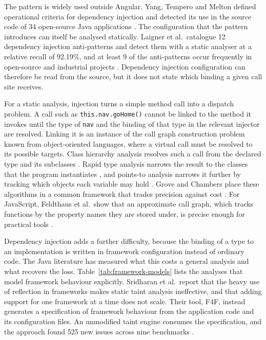 The pattern is widely used outside Angular. Yang, Tempero and Melton defined operational
criteria for dependency injection and detected its use in the source code of 34 open-source Java
applications \cite{yang2008empirical}. The configuration that the pattern introduces can itself be
analysed statically. Laigner et al.\ catalogue 12 dependency injection anti-patterns and detect
them with a static analyser at a relative recall of 92.19\%, and at least 9 of the anti-patterns
occur frequently in open-source and industrial projects \cite{laigner2022cataloging}. Dependency injection
configuration can therefore be read from the source, but it does not state which binding a given
call site receives.

For a static analysis, injection turns a simple method call into a dispatch problem. A call such
as \texttt{this.nav.goHome()} cannot be linked to the method it invokes until the type of
\texttt{nav} and the binding of that type in the relevant injector are resolved. Linking it is an
instance of the call graph construction problem known from object-oriented languages, where a
virtual call must be resolved to its possible targets. Class hierarchy analysis resolves such a
call from the declared type and its subclasses \cite{dean1995cha}. Rapid type analysis narrows
the result to the classes that the program instantiates \cite{bacon1996rta}, and points-to
analysis narrows it further by tracking which objects each variable may hold
\cite{andersen1994pointsto}. Grove and Chambers place these algorithms in a common framework that
trades precision against cost \cite{grove2001callgraph}. For JavaScript, Feldthaus et al.\ show
that an approximate call graph, which tracks functions by the property names they are stored
under, is precise enough for practical tools \cite{feldthaus2013jscg}.

Dependency injection adds a further difficulty, because the binding of a type to an
implementation is written in framework configuration instead of ordinary code. The Java
literature has measured what this costs a general analysis and what recovers the loss.
Table~\ref{tab:framework-models} lists the analyses that model framework behaviour explicitly.
Sridharan et al.\ report that the heavy use of reflection in frameworks makes static taint
analysis ineffective, and that adding support for one framework at a time does not scale. Their
tool, F4F, instead generates a specification of framework behaviour from the application code and
its configuration files. An unmodified taint engine consumes the specification, and the approach
found 525 new issues across nine benchmarks \cite{sridharan2011f4f}.

